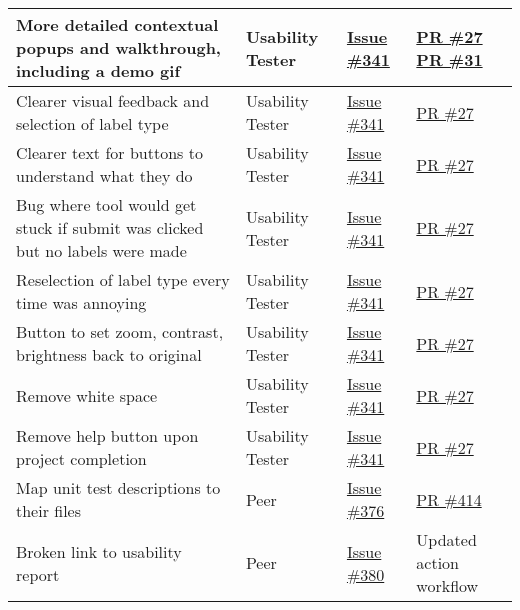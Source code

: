 \documentclass{article}
\begin{document}
\begin{longtable}{|p{5cm}|p{1.5cm}|p{2cm}|p{5cm}|}
More detailed contextual popups and walkthrough, including a demo gif & Usability Tester & \href{https://github.com/OKKM-insights/OKKM.insights/issues/341}{Issue \#341} & \href{https://github.com/OKKM-insights/frontend/pull/27}{PR \#27} \href{https://github.com/OKKM-insights/frontend/pull/31}{PR \#31} \\ \hline
Clearer visual feedback and selection of label type & Usability Tester & \href{https://github.com/OKKM-insights/OKKM.insights/issues/341}{Issue \#341} & \href{https://github.com/OKKM-insights/frontend/pull/27}{PR \#27} \\ \hline
Clearer text for buttons to understand what they do & Usability Tester & \href{https://github.com/OKKM-insights/OKKM.insights/issues/341}{Issue \#341} & \href{https://github.com/OKKM-insights/frontend/pull/27}{PR \#27} \\ \hline
Bug where tool would get stuck if submit was clicked but no labels were made & Usability Tester & \href{https://github.com/OKKM-insights/OKKM.insights/issues/341}{Issue \#341} & \href{https://github.com/OKKM-insights/frontend/pull/27}{PR \#27} \\ \hline
Reselection of label type every time was annoying & Usability Tester & \href{https://github.com/OKKM-insights/OKKM.insights/issues/341}{Issue \#341} & \href{https://github.com/OKKM-insights/frontend/pull/27}{PR \#27} \\ \hline
Button to set zoom, contrast, brightness back to original & Usability Tester & \href{https://github.com/OKKM-insights/OKKM.insights/issues/341}{Issue \#341} & \href{https://github.com/OKKM-insights/frontend/pull/27}{PR \#27} \\ \hline
Remove white space & Usability Tester & \href{https://github.com/OKKM-insights/OKKM.insights/issues/341}{Issue \#341} & \href{https://github.com/OKKM-insights/frontend/pull/27}{PR \#27} \\ \hline
Remove help button upon project completion & Usability Tester & \href{https://github.com/OKKM-insights/OKKM.insights/issues/341}{Issue \#341} & \href{https://github.com/OKKM-insights/frontend/pull/27}{PR \#27} \\ \hline
Map unit test descriptions to their files & Peer & \href{https://github.com/OKKM-insights/OKKM.insights/issues/376}{Issue \#376} & \href{https://github.com/OKKM-insights/OKKM.insights/pull/414}{PR \#414} \\ \hline
Broken link to usability report & Peer & \href{https://github.com/OKKM-insights/OKKM.insights/issues/380}{Issue \#380} & Updated action workflow \\ \hline

\end{longtable}
\end{document}
